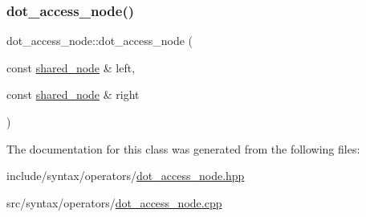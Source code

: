 \subsubsection{\texorpdfstring{dot\+\_\+access\+\_\+node()}{dot\_access\_node()}}
{\footnotesize\ttfamily dot\+\_\+access\+\_\+node\+::dot\+\_\+access\+\_\+node (\begin{DoxyParamCaption}\item[{const \hyperlink{namespacejawe_a3f307481d921b6cbb50cc8511fc2b544}{shared\+\_\+node} \&}]{left,  }\item[{const \hyperlink{namespacejawe_a3f307481d921b6cbb50cc8511fc2b544}{shared\+\_\+node} \&}]{right }\end{DoxyParamCaption})}



The documentation for this class was generated from the following files\+:\begin{DoxyCompactItemize}
\item 
include/syntax/operators/\hyperlink{dot__access__node_8hpp}{dot\+\_\+access\+\_\+node.\+hpp}\item 
src/syntax/operators/\hyperlink{dot__access__node_8cpp}{dot\+\_\+access\+\_\+node.\+cpp}\end{DoxyCompactItemize}
